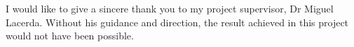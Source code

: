\documentclass[
11pt,
oneside,
english,
singlespacing,
headsepline,
]{MastersDoctoralThesis}
\begin{document}

\begin{acknowledgements}
\addchaptertocentry{\acknowledgementname} %
I would like to give a sincere thank you to my project supervisor, Dr Miguel Lacerda. Without his guidance and direction, the result achieved in this project would not have been possible.
\end{acknowledgements}


\tableofcontents %

\listoffigures %

\listoftables %


\mainmatter %

\pagestyle{thesis} %





% 
% 
% 
% 
% 
%
% 
% 



\appendix %


% 
% 
%


\printbibliography[heading=bibintoc]

\end{document}
